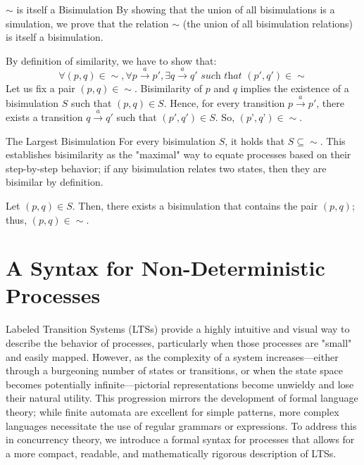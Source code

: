 \begin{Thm}{$\sim$ is itself a Bisimulation}{}
By showing that the union of all bisimulations is a simulation, we prove that the relation $\sim$ (the union of all bisimulation relations) is itself a bisimulation. 

\begin{demonstration}
By definition of similarity, we have to show that:
\begin{equation*}
    \forall (p,q)\in\sim ,\forall p\xrightarrow{a}p',\exists q\xrightarrow{a}q'\textit{ such that }(p',q')\in\sim
\end{equation*}
Let us fix a pair $(p,q) \in \sim$. Bisimilarity of $p$ and $q$ implies the existence of a bisimulation $S$ such that $(p,q) \in S$. Hence, for every transition $p\xrightarrow{a}p'$, there exists a transition $q\xrightarrow{a}q'$ such that $(p', q') \in S$. So, $(p’,q’) \in \sim$.
\end{demonstration}
\end{Thm}

\begin{Thm}{The Largest Bisimulation}{}
For every bisimulation $S$, it holds that $S\subseteq\sim$. This establishes bisimilarity as the "maximal" way to equate processes based on their step-by-step behavior; if any bisimulation relates two states, then they are bisimilar by definition.

\begin{demonstration}
Let $(p,q) \in S$. Then, there exists a bisimulation that contains the pair $(p, q)$; thus, $(p, q) \in \sim$.
\end{demonstration}
\end{Thm}

\section{A Syntax for Non-Deterministic Processes}
Labeled Transition Systems (LTSs) provide a highly intuitive and visual way to describe the behavior of processes, particularly when those processes are "small" and easily mapped. However, as the complexity of a system increases—either through a burgeoning number of states or transitions, or when the state space becomes potentially infinite—pictorial representations become unwieldy and lose their natural utility. This progression mirrors the development of formal language theory; while finite automata are excellent for simple patterns, more complex languages necessitate the use of regular grammars or expressions. To address this in concurrency theory, we introduce a formal syntax for processes that allows for a more compact, readable, and mathematically rigorous description of LTSs.

